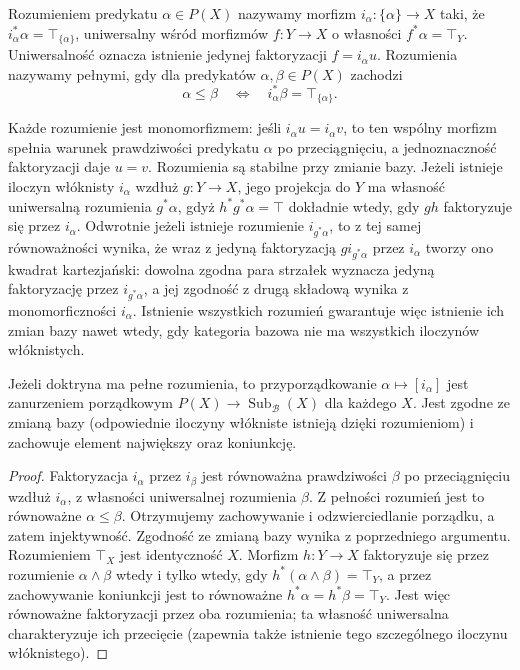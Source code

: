 \begin{definicja}\label{cat:def:cl-doctrine-comprehension}
Rozumieniem predykatu $\alpha\in P(X)$ nazywamy morfizm $i_\alpha:\{\alpha\}\to X$ taki, że $i_\alpha^*\alpha=\top_{\{\alpha\}}$, uniwersalny wśród morfizmów $f:Y\to X$ o własności $f^*\alpha=\top_Y$. Uniwersalność oznacza istnienie jedynej faktoryzacji $f=i_\alpha u$. Rozumienia nazywamy pełnymi, gdy dla predykatów $\alpha,\beta\in P(X)$ zachodzi
\[
 \alpha\leq\beta\quad\Longleftrightarrow\quad i_\alpha^*\beta=\top_{\{\alpha\}}.
\]
\end{definicja}

Każde rozumienie jest monomorfizmem: jeśli $i_\alpha u=i_\alpha v$, to ten wspólny morfizm spełnia warunek prawdziwości predykatu $\alpha$ po przeciągnięciu, a jednoznaczność faktoryzacji daje $u=v$. Rozumienia są stabilne przy zmianie bazy. Jeżeli istnieje iloczyn włóknisty $i_\alpha$ wzdłuż $g:Y\to X$, jego projekcja do $Y$ ma własność uniwersalną rozumienia $g^*\alpha$, gdyż $h^*g^*\alpha=\top$ dokładnie wtedy, gdy $gh$ faktoryzuje się przez $i_\alpha$. Odwrotnie jeżeli istnieje rozumienie $i_{g^*\alpha}$, to z tej samej równoważności wynika, że wraz z jedyną faktoryzacją $gi_{g^*\alpha}$ przez $i_\alpha$ tworzy ono kwadrat kartezjański: dowolna zgodna para strzałek wyznacza jedyną faktoryzację przez $i_{g^*\alpha}$, a jej zgodność z drugą składową wynika z monomorficzności $i_\alpha$. Istnienie wszystkich rozumień gwarantuje więc istnienie ich zmian bazy nawet wtedy, gdy kategoria bazowa nie ma wszystkich iloczynów włóknistych.

\begin{stwierdzenie}\label{cat:prop:cl-comprehension-embedding}
Jeżeli doktryna ma pełne rozumienia, to przyporządkowanie $\alpha\mapsto[i_\alpha]$ jest zanurzeniem porządkowym $P(X)\to\operatorname{Sub}_{\mathcal B}(X)$ dla każdego $X$. Jest zgodne ze zmianą bazy (odpowiednie iloczyny włókniste istnieją dzięki rozumieniom) i zachowuje element największy oraz koniunkcję.
\end{stwierdzenie}
\begin{proof}
Faktoryzacja $i_\alpha$ przez $i_\beta$ jest równoważna prawdziwości $\beta$ po przeciągnięciu wzdłuż $i_\alpha$, z własności uniwersalnej rozumienia $\beta$. Z pełności rozumień jest to równoważne $\alpha\leq\beta$. Otrzymujemy zachowywanie i odzwierciedlanie porządku, a zatem injektywność. Zgodność ze zmianą bazy wynika z poprzedniego argumentu. Rozumieniem $\top_X$ jest identyczność $X$. Morfizm $h:Y\to X$ faktoryzuje się przez rozumienie $\alpha\wedge\beta$ wtedy i tylko wtedy, gdy $h^*(\alpha\wedge\beta)=\top_Y$, a przez zachowywanie koniunkcji jest to równoważne $h^*\alpha=h^*\beta=\top_Y$. Jest więc równoważne faktoryzacji przez oba rozumienia; ta własność uniwersalna charakteryzuje ich przecięcie (zapewnia także istnienie tego szczególnego iloczynu włóknistego).
\end{proof}


